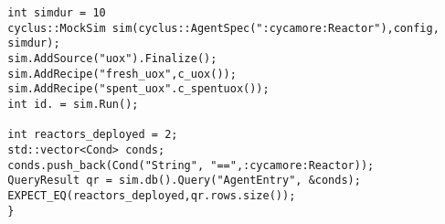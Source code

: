 \documentclass[12pt,letterpaper]{article}
\begin{document}
\begin{enumerate}
\begin{verbatim}
  int simdur = 10 
  cyclus::MockSim sim(cyclus::AgentSpec(":cycamore:Reactor"),config,
  simdur); 
  sim.AddSource("uox").Finalize();
  sim.AddRecipe("fresh_uox",c_uox());
  sim.AddRecipe("spent_uox".c_spentuox());
  int id. = sim.Run();
  
  int reactors_deployed = 2; 
  std::vector<Cond> conds; 
  conds.push_back(Cond("String", "==",:cycamore:Reactor)); 
  QueryResult qr = sim.db().Query("AgentEntry", &conds);
  EXPECT_EQ(reactors_deployed,qr.rows.size());
  }
\end{verbatim}
\end{enumerate}
\end{document}
